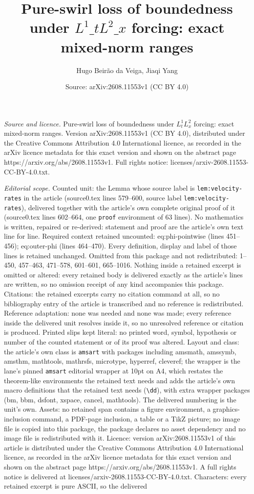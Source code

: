 \documentclass[10pt,a4paper]{amsart}
\title[Pure-swirl loss of boundedness under $L^1\_tL^2\_x$ forcing: e]{Pure-swirl loss of boundedness under $L^1\_tL^2\_x$ forcing: exact mixed-norm ranges}
\author{Hugo Beir\~ao da Veiga, Jiaqi Yang}
\date{Source: arXiv:2608.11553v1 (CC BY 4.0)}
\begin{document}
\maketitle

\noindent\emph{Source and licence.} Pure-swirl loss of boundedness under $L^1_tL^2_x$ forcing: exact mixed-norm ranges. Version arXiv:2608.11553v1 (CC BY 4.0), distributed under the Creative Commons Attribution 4.0 International licence, as recorded in the arXiv licence metadata for this exact version and shown on the abstract page https://arxiv.org/abs/2608.11553v1. Full rights notice: licenses/arxiv-2608.11553-CC-BY-4.0.txt.\par\smallskip

\noindent\textit{Editorial scope.} Counted unit: the Lemma whose source label is \texttt{lem:velocity-rates} in the article (source0.tex lines 579--600, source label \texttt{lem:velocity-rates}), delivered together with the article's own complete original proof of it (source0.tex lines 602--664, one \texttt{proof} environment of 63 lines). No mathematics is written, repaired or re-derived: statement and proof are the article's own text line for line. Required context retained uncounted: eq:phi-pointwise (lines 451--456); eq:outer-phi (lines 464--470). Every definition, display and label of those lines is retained unchanged. Omitted from this package and not redistributed: 1--450, 457--463, 471--578, 601--601, 665--1016. Nothing inside a retained excerpt is omitted or altered: every retained body is delivered exactly as the article's lines are written, so no omission receipt of any kind accompanies this package. Citations: the retained excerpts carry no citation command at all, so no bibliography entry of the article is transcribed and no reference is redistributed. Reference adaptation: none was needed and none was made; every reference inside the delivered unit resolves inside it, so no unresolved reference or citation is produced. Printed slips kept literal: no printed word, symbol, hypothesis or number of the counted statement or of its proof was altered. Layout and class: the article's own class is \texttt{amsart} with packages including amsmath, amssymb, amsthm, mathtools, mathrsfs, microtype, hyperref, cleveref; the wrapper is the lane's pinned \texttt{amsart} editorial wrapper at 10pt on A4, which restates the theorem-like environments the retained text needs and adds the article's own macro definitions that the retained text needs (\texttt{\textbackslash dd}), with extra wrapper packages (bm, bbm, dsfont, xspace, cancel, mathtools). The delivered numbering is the unit's own. Assets: no retained span contains a figure environment, a graphics-inclusion command, a PDF-page inclusion, a table or a TikZ picture; no image file is copied into this package, the package declares no asset dependency and no image file is redistributed with it. Licence: version arXiv:2608.11553v1 of this article is distributed under the Creative Commons Attribution 4.0 International licence, as recorded in the arXiv licence metadata for this exact version and shown on the abstract page https://arxiv.org/abs/2608.11553v1. A full rights notice is delivered at licenses/arxiv-2608.11553-CC-BY-4.0.txt. Characters: every retained excerpt is pure ASCII, so the delivered 
\end{document}
